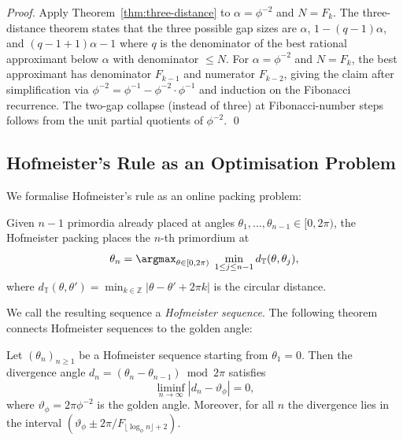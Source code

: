 \begin{proof}
Apply Theorem~\ref{thm:three-distance} to $\alpha = \phi^{-2}$ and
$N = F_k$.  The three-distance theorem states that the three possible
gap sizes are $\alpha$, $1 - (q-1)\alpha$, and $(q-1+1)\alpha - 1$
where $q$ is the denominator of the best rational approximant below
$\alpha$ with denominator $\leq N$.  For $\alpha = \phi^{-2}$ and
$N = F_k$, the best approximant has denominator $F_{k-1}$ and
numerator $F_{k-2}$, giving the claim after simplification via
$\phi^{-2} = \phi^{-1} - \phi^{-2}\cdot \phi^{-1}$ and induction on
the Fibonacci recurrence.  The two-gap collapse (instead of three) at
Fibonacci-number steps follows from the unit partial quotients of
$\phi^{-2}$.
\qed
\end{proof}

\subsection{Hofmeister's Rule as an Optimisation Problem}
\label{subsec:hofmeister-formal}

We formalise Hofmeister's rule \cite{hofmeister1868allgemeine} as an
online packing problem:

\begin{definition}\label{def:hofmeister-pack}
Given $n-1$ primordia already placed at angles
$\theta_1, \ldots, \theta_{n-1} \in [0, 2\pi)$, the Hofmeister packing
places the $n$-th primordium at
\[
  \theta_n = \argmax_{\theta \in [0,2\pi)} \;
  \min_{1 \leq j \leq n-1} d_{\mathbb{T}}(\theta, \theta_j),
\]
where $d_{\mathbb{T}}(\theta, \theta') = \min_{k\in\mathbb{Z}}|\theta-\theta'+2\pi k|$
is the circular distance.
\end{definition}

We call the resulting sequence a \emph{Hofmeister sequence}.  The
following theorem connects Hofmeister sequences to the golden angle:

\begin{theorem}
\label{thm:hofmeister-converge}
Let $(\theta_n)_{n \geq 1}$ be a Hofmeister sequence starting from
$\theta_1 = 0$.  Then the divergence angle
$d_n = (\theta_n - \theta_{n-1}) \bmod 2\pi$ satisfies
\[
  \liminf_{n \to \infty} \left| d_n - \vartheta_\phi \right| = 0,
\]
where $\vartheta_\phi = 2\pi\phi^{-2}$ is the golden angle.
Moreover, for all $n$ the divergence lies in the interval
$(\vartheta_\phi \pm 2\pi/F_{\lfloor \log_\phi n \rfloor + 2})$.
\end{theorem}

